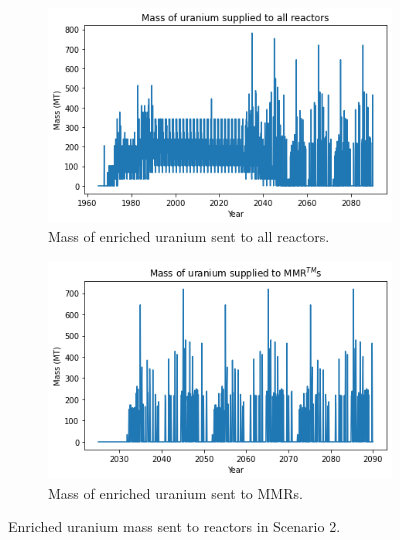 \begin{figure}
    \centering
    \begin{subfigure}{0.5\textwidth}
        \centering
        \includegraphics[scale=0.5]{../figures/fuelsupply_scenarios_2.png}
        \caption{Mass of enriched uranium sent to all reactors.}
        \label{fig:totalfuel_2}
    \end{subfigure}
    \hspace{0.8cm}
    \begin{subfigure}{0.5\textwidth}
        \centering
        \includegraphics[scale=0.5]{../figures/advancedRX_fuelsupply_scenarios_2.png}
        \caption{Mass of enriched uranium sent to \glspl{MMR}.}
        \label{fig:haleu_2}
    \end{subfigure}
    \caption{Enriched uranium mass sent to reactors in Scenario 2.}
    \label{fig:fuel_2}
\end{figure}

